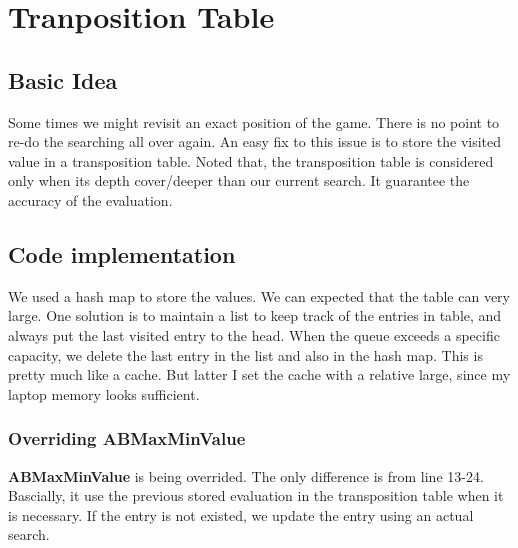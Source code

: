 \documentclass{article}
\begin{document}
\clearpage
\section{Tranposition Table}
\subsection{Basic Idea}
Some times we might revisit an exact position of the game. There is no point to re-do the searching all over again. An easy fix to this issue is to store the visited value in a transposition table. Noted that, the transposition table is considered only when its depth cover/deeper than our current search. It guarantee the accuracy of the evaluation.



\subsection{Code implementation}
We used a hash map to store the values. We can expected that the table can very large.  One solution is to maintain a list to keep track of the entries in table, and always put the last visited entry to the head. When the queue exceeds a specific capacity, we delete the last entry in the list and also in the hash map. This is pretty much like a cache. But latter I set the cache with a relative large, since my laptop memory looks sufficient.

\subsubsection{Overriding ABMaxMinValue}


\textbf{ABMaxMinValue} is being overrided. The only difference is from line 13-24. Bascially, it use the previous stored evaluation in the transposition table when it is necessary. If the entry is not existed, we update the entry using an actual search.
\end{document}
